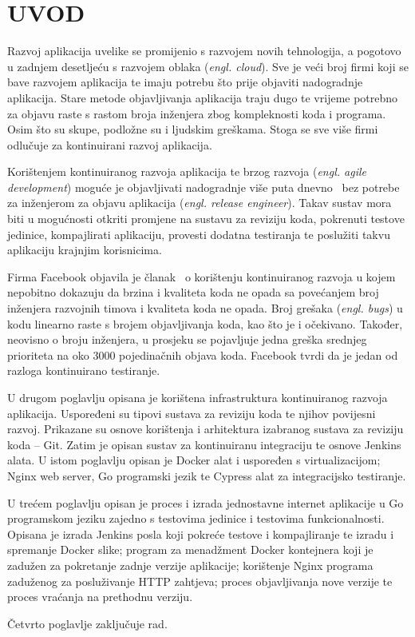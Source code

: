 \chapter{UVOD}
Razvoj aplikacija uvelike se promijenio s razvojem novih tehnologija, a pogotovo u zadnjem desetljeću
s razvojem oblaka (\textit{engl. cloud}). Sve je veći broj firmi koji se bave razvojem aplikacija
te imaju potrebu što prije objaviti nadogradnje aplikacija. Stare metode objavljivanja aplikacija
traju dugo te vrijeme potrebno za objavu raste s rastom broja inženjera zbog kompleknosti koda i
programa. Osim što su skupe, podložne su i ljudskim greškama. Stoga se sve više firmi odlučuje za
kontinuirani razvoj aplikacija.

Korištenjem kontinuiranog razvoja aplikacija te brzog razvoja (\textit{engl. agile development})
moguće je objavljivati nadogradnje više puta dnevno~\citep{abrahamsson2017agile} bez potrebe za
inženjerom za objavu aplikacija (\textit{engl. release engineer}). Takav sustav mora biti u
mogućnosti otkriti promjene na sustavu za reviziju koda, pokrenuti testove jedinice, kompajlirati
aplikaciju, provesti dodatna testiranja te poslužiti takvu aplikaciju krajnjim korisnicima.

Firma Facebook objavila je članak~\citep{rossi2016continuous} o korištenju kontinuiranog razvoja u
kojem nepobitno dokazuju da brzina i kvaliteta koda ne opada sa povećanjem broj inženjera razvojnih
timova i kvaliteta koda ne opada. Broj grešaka (\textit{engl. bugs}) u kodu linearno raste s brojem
objavljivanja koda, kao što je i očekivano. Također, neovisno o broju inženjera, u prosjeku se
pojavljuje jedna greška srednjeg prioriteta na oko 3000 pojedinačnih objava koda. Facebook tvrdi da
je jedan od razloga kontinuirano testiranje.

U drugom poglavlju opisana je korištena infrastruktura kontinuiranog razvoja aplikacija. Uspoređeni
su tipovi sustava za reviziju koda te njihov povijesni razvoj. Prikazane su osnove korištenja i
arhitektura izabranog sustava za reviziju koda -- Git. Zatim je opisan sustav za kontinuiranu
integraciju te osnove Jenkins alata. U istom poglavlju opisan je Docker alat i uspoređen s
virtualizacijom; Nginx web server, Go programski jezik te Cypress alat za integracijsko testiranje.

U trećem poglavlju opisan je proces i izrada jednostavne internet aplikacije u Go programskom jeziku
zajedno s testovima jedinice i testovima funkcionalnosti. Opisana je izrada Jenkins posla koji
pokreće testove i kompajliranje te izradu i spremanje Docker slike; program za
menadžment Docker kontejnera koji je zadužen za pokretanje zadnje verzije aplikacije; korištenje
Nginx programa zaduženog za posluživanje HTTP zahtjeva; proces objavljivanja nove verzije te proces
vraćanja na prethodnu verziju.

Četvrto poglavlje zaključuje rad.
